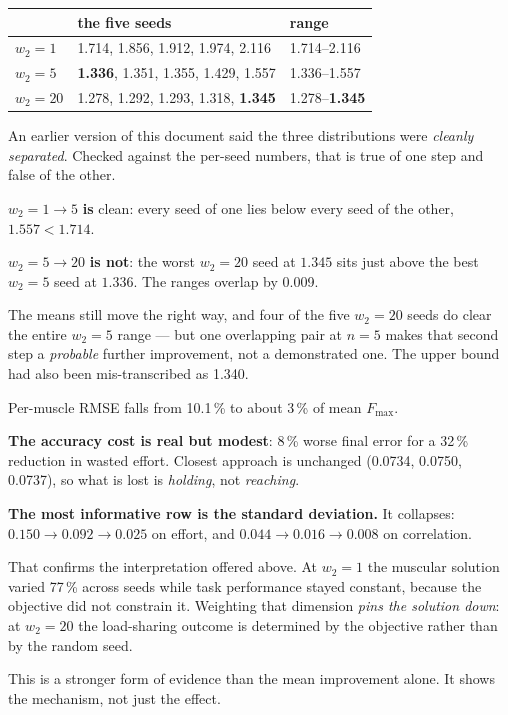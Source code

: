 \begin{center}
\begin{tabular}{@{} L{2.2cm} L{7.2cm} C{3.0cm} @{}}
\toprule
& \textbf{the five seeds} & \textbf{range} \\
\midrule
$w_2 = 1$  & 1.714, 1.856, 1.912, 1.974, 2.116 & 1.714--2.116 \\
$w_2 = 5$  & \textbf{1.336}, 1.351, 1.355, 1.429, 1.557 & 1.336--1.557 \\
$w_2 = 20$ & 1.278, 1.292, 1.293, 1.318, \textbf{1.345} & 1.278--\textbf{1.345} \\
\bottomrule
\end{tabular}
\end{center}

\begin{trap}
An earlier version of this document said the three distributions were
\emph{cleanly separated}. Checked against the per-seed numbers, that is true of
one step and false of the other.

$w_2 = 1 \rightarrow 5$ \textbf{is} clean: every seed of one lies below every seed
of the other, $1.557 < 1.714$.

$w_2 = 5 \rightarrow 20$ \textbf{is not}: the worst $w_2 = 20$ seed at
$\mathbf{1.345}$ sits just above the best $w_2 = 5$ seed at $\mathbf{1.336}$. The
ranges overlap by 0.009.

The means still move the right way, and four of the five $w_2 = 20$ seeds do
clear the entire $w_2 = 5$ range --- but one overlapping pair at $n = 5$ makes
that second step a \emph{probable} further improvement, not a demonstrated one.
The upper bound had also been mis-transcribed as 1.340.
\end{trap}

Per-muscle RMSE falls from 10.1\,\% to about 3\,\% of mean $F_{\max}$.

\textbf{The accuracy cost is real but modest}: 8\,\% worse final error for a
32\,\% reduction in wasted effort. Closest approach is unchanged
(0.0734, 0.0750, 0.0737), so what is lost is \emph{holding}, not \emph{reaching}.

\begin{why}
\textbf{The most informative row is the standard deviation.} It collapses:
$0.150 \rightarrow 0.092 \rightarrow 0.025$ on effort, and
$0.044 \rightarrow 0.016 \rightarrow 0.008$ on correlation.

That confirms the interpretation offered above. At $w_2 = 1$ the muscular
solution varied 77\,\% across seeds while task performance stayed constant,
because the objective did not constrain it. Weighting that dimension \emph{pins
the solution down}: at $w_2 = 20$ the load-sharing outcome is determined by the
objective rather than by the random seed.

This is a stronger form of evidence than the mean improvement alone. It shows the
mechanism, not just the effect.
\end{why}

